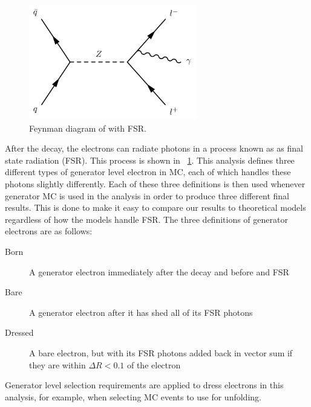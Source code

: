 \begin{figure}[tb]
    \centering
    \includegraphics[width=0.65\textwidth]{figures/fsr.pdf}
    \caption{
        Feynman diagram of \Ztoll with FSR.
    }
    \label{fig:fsr_diagram}
\end{figure}

After the \Ztoee decay, the electrons can radiate photons in a process known as
as final state radiation (FSR). This process is shown in
\FIG~\ref{fig:fsr_diagram}. This analysis defines three different types of
generator level electron in MC, each of which handles these photons slightly
differently. Each of these three definitions is then used whenever generator MC
is used in the analysis in order to produce three different final results. This
is done to make it easy to compare our results to theoretical models regardless
of how the models handle FSR. The three definitions of generator electrons are
as follows:

\begin{description}
    \item[Born] A generator electron immediately after the \Ztoee decay and
        before and FSR
    \item[Bare] A generator electron after it has shed all of its FSR photons
    \item[Dressed] A bare electron, but with its FSR photons added back in
        vector sum if they are within $\Delta R < 0.1$ of the electron
\end{description}

Generator level selection requirements are applied to dress electrons in this
analysis, for example, when selecting MC events to use for unfolding.
